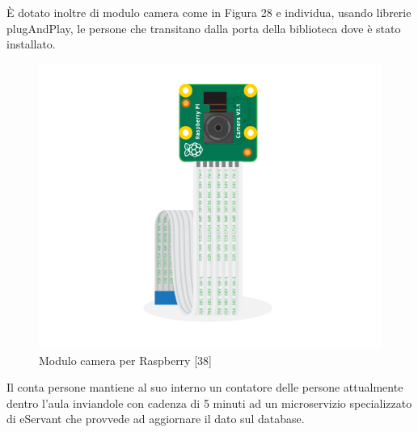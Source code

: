 È dotato inoltre di modulo camera come in Figura 28 e individua, usando librerie plugAndPlay, le persone che transitano 
dalla porta della biblioteca dove è stato installato.

\begin{figure}[H]
    \centering  
    \caption{Modulo camera per Raspberry [38]}
    \includegraphics[scale=0.2]{img/cap4/camera}
\end{figure}

Il conta persone mantiene al suo interno un contatore delle persone attualmente dentro l'aula
inviandole con cadenza di 5 minuti ad un microservizio specializzato di eServant che provvede ad
aggiornare il dato sul database.
